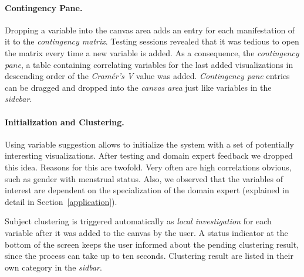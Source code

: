 \documentclass[journal]{style/vgtc} 			          %
\newcommand{\com}[1]{\textcolor{orange}{\uline{#1}}}
\begin{document}
\paragraph{Contingency Pane.}
Dropping a variable into the canvas area adds an entry for each manifestation of it to the \emph{contingency matrix}.
%
Testing sessions revealed that it was tedious to open the matrix every time a new variable is added. 
%
As a consequence, the \emph{contingency pane}, a table containing correlating variables for the last added visualizations in descending order of the \emph{Cram\'{e}r's V} value was added.
%
\emph{Contingency pane} entries can be dragged and dropped into the \emph{canvas area} just like variables in the \emph{sidebar}.
%
\paragraph{Initialization and Clustering.}
Using variable suggestion allows to initialize the system with a set of potentially interesting visualizations.
%
After testing and domain expert feedback we dropped this idea.
%
Reasons for this are twofold.
%
Very often are high correlations obvious, such as gender with menstrual status.
%
Also, we observed that the variables of interest are dependent on the specialization of the domain expert (explained in detail in Section~\ref{application}).

Subject clustering is triggered automatically as \emph{local investigation} for each variable after it was added to the canvas by the user.
%
A status indicator at the bottom of the screen keeps the user informed about the pending clustering result, since the process can take up to ten seconds.
%
Clustering result are listed in their own category in the \emph{sidbar}.
%
\end{document}

